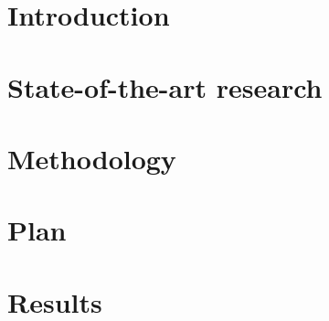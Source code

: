 \documentclass[10pt,notitlepage]{article}
\begin{document}
\section{Introduction}
\label{sec:Introduction}


%

\section{State-of-the-art research}
\label{sec:SOTA}



\section{Methodology}
\label{sec:Methodology}


\section{Plan}
\label{sec:Plan}




\section{Results}
\label{sec:Results}



%

%





\end{document}
